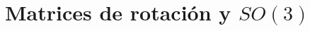 \documentclass[11pt]{beamer}
\newcommand{\srcBarfoot}{\href{https://asrl.utias.utoronto.ca/~tdb/bib/barfoot_ser17.pdf}{Barfoot (2017)}}
\newcommand{\SourceLine}[1]{\vfill{\tiny\textcolor{gray}{Fuentes: #1}}}
\begin{document}
%
%
%
%
%
%
%
%
%
%
%
%

\section{Matrices de rotación y \(SO(3)\)}
\end{document}
